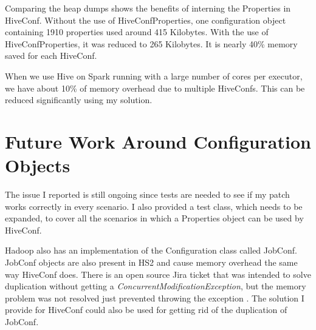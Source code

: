 Comparing the heap dumps shows the benefits of interning the Properties in HiveConf. Without the use of HiveConfProperties, one configuration object containing 1910 properties used around 415 Kilobytes. With the use of HiveConfProperties, it was reduced to 265 Kilobytes. It is nearly 40\% memory saved for each HiveConf. 

When we use Hive on Spark running with a large number of cores per executor, we have about 10\% of memory overhead due to multiple HiveConfs. This can be reduced significantly using my solution. 

\section{Future Work Around Configuration Objects}
The issue I reported is still ongoing since tests are needed to see if my patch works correctly in every scenario. I also provided a test class, which needs to be expanded, to cover all the scenarios in which a Properties object can be used by HiveConf. 

Hadoop also has an implementation of the Configuration class called JobConf. JobConf objects are also present in HS2 and cause memory overhead the same way HiveConf does. There is an open source Jira ticket that was intended to solve duplication without getting a \textit{ConcurrentModificationException}, but the memory problem was not resolved just prevented throwing the exception \cite{hive-jobconf}. The solution I provide for HiveConf could also be used for getting rid of the duplication of JobConf.